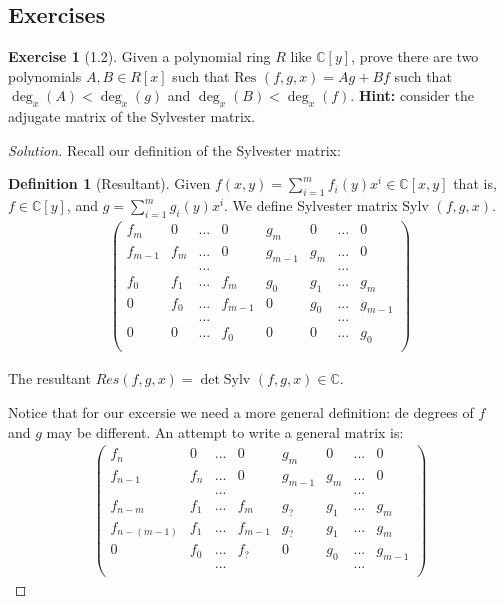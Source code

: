 \documentclass{article}
\theoremstyle{definition}
\newtheorem*{exer*}{Exercise}
\newtheorem*{defn}{Definition}
\newcommand{\C}{\mathbb{C}}
\newcommand{\Res}{\text{Res }}
\begin{document}
\subsection{Exercises}
\begin{exer*}[1.2] Given a polynomial ring $R$ like $\C[y]$, prove there are two polynomials $A,B\in R[x]$ such that $\Res(f,g,x)=Ag+Bf$ such that $\deg _x(A)<\deg_x(g)$ and $\deg_x(B)<\deg_x(f)$. \textbf{Hint:} consider the adjugate matrix of the Sylvester matrix.\par
\begin{proof}[Solution]
    Recall our definition of the Sylvester matrix:
\begin{defn}[Resultant]
	Given $f(x,y)=\sum_{i=1}^m f_i(y)x^i \in\C[x,y]$ that is, $f\in\C[y]$, and $g=\sum_{i=1}^m g_i(y)x^i$. We define Sylvester matrix $\text{Sylv }(f,g,x)$.\\
	\begin{align*}
		\begin{pmatrix}f_m&0&...&0&g_m&0&...&0\\ 
			f_{m-1}&f_{m}&...&0&g_{m-1}&g_{m}&...&0\\
      &&...&&&&...&\\
			f_0 & f_1&...&f_m&g_0 & g_1&...&g_m\\
			0&f_0&...&f_{m-1}&0&g_0&...&g_{m-1}\\
         &&...&&&&...&\\
   			0&0&...&f_0&0&0&...&g_0\\
		\end{pmatrix}
	\end{align*}\par
	The resultant $Res(f,g,x)=\det \text{Sylv }(f,g,x)\in \C$.
 \end{defn}
Notice that for our excersie we need a more general definition: de degrees of $f$ and $g$ may be different. An attempt to write a general matrix is:
	\begin{align*}
		\begin{pmatrix}f_n&0&...&0&g_m&0&...&0\\ 
			f_{n-1}&f_{n}&...&0&g_{m-1}&g_{m}&...&0\\
      &&...&&&&...&\\
			f_{n-m} & f_1&...&f_m&g_? & g_1&...&g_m\\
   			f_{n-(m-1)} & f_1&...&f_{m-1}&g_? & g_1&...&g_m\\
			0&f_0&...&f_{?}&0&g_0&...&g_{m-1}\\
         &&...&&&&...&\\

\end{pmatrix}
\end{align*}
\end{proof}
\end{exer*}
\end{document}
